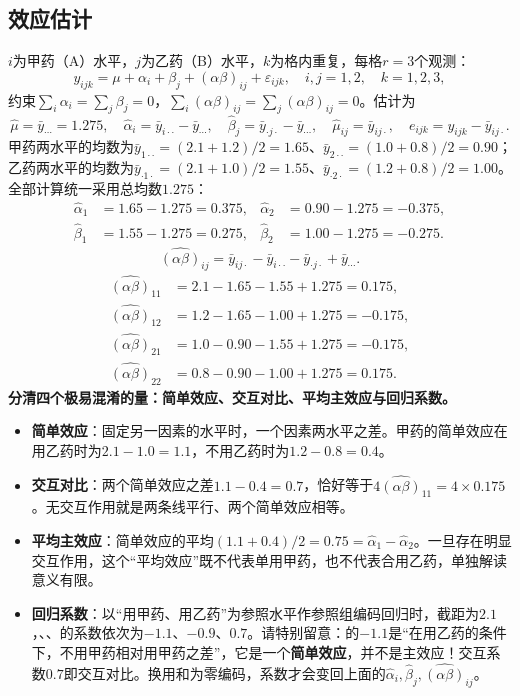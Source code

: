 \subsection{效应估计}
$i$为甲药（A）水平，$j$为乙药（B）水平，$k$为格内重复，每格$r=3$个观测：
\[
y_{ijk}=\mu+\alpha_i+\beta_j+(\alpha\beta)_{ij}+\varepsilon_{ijk},
\quad i,j=1,2,\quad k=1,2,3,
\]
约束$\sum_i\alpha_i=\sum_j\beta_j=0$，$\sum_i(\alpha\beta)_{ij}=\sum_j(\alpha\beta)_{ij}=0$。估计为
\[
\widehat\mu=\bar y_{\cdots}=1.275,\quad
\widehat\alpha_i=\bar y_{i\cdot\cdot}-\bar y_{\cdots},\quad
\widehat\beta_j=\bar y_{\cdot j\cdot}-\bar y_{\cdots},\quad
\widehat\mu_{ij}=\bar y_{ij\cdot},\quad e_{ijk}=y_{ijk}-\bar y_{ij\cdot}.
\]
甲药两水平的均数为$\bar y_{1\cdot\cdot}=(2.1+1.2)/2=1.65$、$\bar y_{2\cdot\cdot}=(1.0+0.8)/2=0.90$；乙药两水平的均数为$\bar y_{\cdot1\cdot}=(2.1+1.0)/2=1.55$、$\bar y_{\cdot2\cdot}=(1.2+0.8)/2=1.00$。全部计算统一采用总均数$1.275$：
\begin{align*}
\widehat\alpha_1&=1.65-1.275=0.375,&
\widehat\alpha_2&=0.90-1.275=-0.375,\\
\widehat\beta_1&=1.55-1.275=0.275,&
\widehat\beta_2&=1.00-1.275=-0.275.
\end{align*}
\[
\widehat{(\alpha\beta)}_{ij}=\bar y_{ij\cdot}-\bar y_{i\cdot\cdot}-\bar y_{\cdot j\cdot}+\bar y_{\cdots}.
\]
\begin{align*}
\widehat{(\alpha\beta)}_{11}&=2.1-1.65-1.55+1.275=0.175,\\
\widehat{(\alpha\beta)}_{12}&=1.2-1.65-1.00+1.275=-0.175,\\
\widehat{(\alpha\beta)}_{21}&=1.0-0.90-1.55+1.275=-0.175,\\
\widehat{(\alpha\beta)}_{22}&=0.8-0.90-1.00+1.275=0.175.
\end{align*}
\textbf{分清四个极易混淆的量：简单效应、交互对比、平均主效应与回归系数。}
\begin{itemize}
\item \textbf{简单效应}：固定另一因素的水平时，一个因素两水平之差。甲药的简单效应在用乙药时为$2.1-1.0=1.1$，不用乙药时为$1.2-0.8=0.4$。
\item \textbf{交互对比}：两个简单效应之差$1.1-0.4=0.7$，恰好等于$4\widehat{(\alpha\beta)}_{11}=4\times0.175$。无交互作用就是两条线平行、两个简单效应相等。
\item \textbf{平均主效应}：简单效应的平均$(1.1+0.4)/2=0.75=\widehat\alpha_1-\widehat\alpha_2$。一旦存在明显交互作用，这个“平均效应”既不代表单用甲药，也不代表合用乙药，单独解读意义有限。
\item \textbf{回归系数}：以“用甲药、用乙药”为参照水平作参照组编码回归时，截距为$2.1$，、、的系数依次为$-1.1$、$-0.9$、$0.7$。请特别留意：的$-1.1$是“在用乙药的条件下，不用甲药相对用甲药之差”，它是一个\textbf{简单效应}，并不是主效应！交互系数$0.7$即交互对比。换用和为零编码，系数才会变回上面的$\widehat\alpha_i,\widehat\beta_j,\widehat{(\alpha\beta)}_{ij}$。
\end{itemize}
